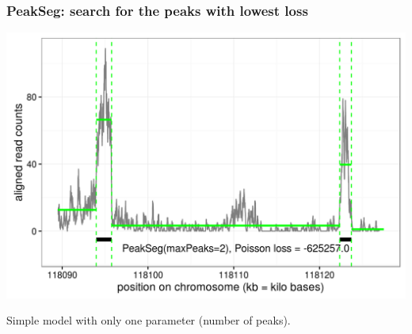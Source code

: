 \documentclass{beamer}
\begin{document}
\begin{frame}
  \frametitle{PeakSeg: search for the peaks with lowest loss}
  \includegraphics[width=1\textwidth]{figure-macs-problem-PeakSeg.png}

  Simple model with only one parameter (number of peaks).

\end{frame}



\end{document}
